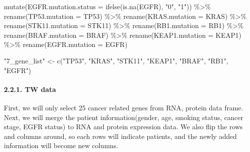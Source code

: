 \documentclass[
]{article}
\newenvironment{Shaded}{\begin{snugshade}}{\end{snugshade}}
\newcommand{\AttributeTok}[1]{\textcolor[rgb]{0.77,0.63,0.00}{#1}}
\newcommand{\FunctionTok}[1]{\textcolor[rgb]{0.00,0.00,0.00}{#1}}
\newcommand{\NormalTok}[1]{#1}
\newcommand{\OtherTok}[1]{\textcolor[rgb]{0.56,0.35,0.01}{#1}}
\newcommand{\SpecialCharTok}[1]{\textcolor[rgb]{0.00,0.00,0.00}{#1}}
\newcommand{\StringTok}[1]{\textcolor[rgb]{0.31,0.60,0.02}{#1}}
\begin{document}
\begin{Shaded}
\begin{Highlighting}[]
  \FunctionTok{mutate}\NormalTok{(}\AttributeTok{EGFR.mutation.status =} \FunctionTok{ifelse}\NormalTok{(}\FunctionTok{is.na}\NormalTok{(EGFR), }\StringTok{"0"}\NormalTok{, }\StringTok{"1"}\NormalTok{)) }\SpecialCharTok{\%\textgreater{}\%}
  \FunctionTok{rename}\NormalTok{(}\AttributeTok{TP53.mutation =}\NormalTok{ TP53) }\SpecialCharTok{\%\textgreater{}\%}
  \FunctionTok{rename}\NormalTok{(}\AttributeTok{KRAS.mutation =}\NormalTok{ KRAS) }\SpecialCharTok{\%\textgreater{}\%}
  \FunctionTok{rename}\NormalTok{(}\AttributeTok{STK11.mutation =}\NormalTok{ STK11) }\SpecialCharTok{\%\textgreater{}\%}
  \FunctionTok{rename}\NormalTok{(}\AttributeTok{RB1.mutation =}\NormalTok{ RB1) }\SpecialCharTok{\%\textgreater{}\%}
  \FunctionTok{rename}\NormalTok{(}\AttributeTok{BRAF.mutation =}\NormalTok{ BRAF) }\SpecialCharTok{\%\textgreater{}\%}
  \FunctionTok{rename}\NormalTok{(}\AttributeTok{KEAP1.mutation =}\NormalTok{ KEAP1) }\SpecialCharTok{\%\textgreater{}\%}
  \FunctionTok{rename}\NormalTok{(}\AttributeTok{EGFR.mutation =}\NormalTok{ EGFR)}

\StringTok{"7\_gene\_list"} \OtherTok{\textless{}{-}} \FunctionTok{c}\NormalTok{(}\StringTok{"TP53"}\NormalTok{, }\StringTok{"KRAS"}\NormalTok{, }\StringTok{"STK11"}\NormalTok{, }\StringTok{"KEAP1"}\NormalTok{, }\StringTok{"BRAF"}\NormalTok{, }\StringTok{"RB1"}\NormalTok{, }\StringTok{"EGFR"}\NormalTok{)}
\end{Highlighting}
\end{Shaded}

\hypertarget{tw-data}{%
\paragraph{2.2.1. TW data}\label{tw-data}}

First, we will only select 25 cancer related genes from RNA, protein
data frame. Next, we will merge the patient information(gender, age,
smoking status, cancer stage, EGFR status) to RNA and protein expression
data. We also flip the rows and columns around, so each rows will
indicate patients, and the newly added information will become new
columns.
\end{document}
